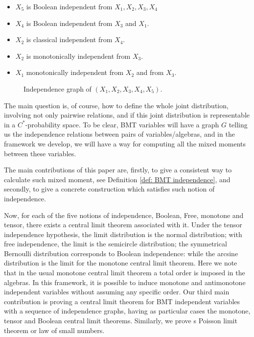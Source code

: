 \documentclass[a4paper,12pt]{extarticle}
\theoremstyle{definition}
\theoremstyle{remark}
\begin{document}
\begin{itemize}
    \item  $X_5$ is Boolean independent from $X_1,X_2,X_3,X_4$
\item $X_4$ is Boolean independent from $X_3$ and $X_1$.
\item $X_2$ is classical independent from $X_4$.
\item  $X_2$ is monotonically independent from $X_3$.
\item $X_1$ monotonically independent from $X_2$ and from $X_3$.
\end{itemize}

\begin{figure} %
\centering 
  \caption{Independence graph of $(X_1,X_2,X_3,X_4,X_5)$.}
  \label{graph1}
\end{figure}

The main question is, of course, how to define the whole joint distribution, involving not only pairwise relations, and if this joint distribution is representable in a $C^{\ast}$-probability space.  To be clear, BMT variables will have a graph $G$ telling us the independence relations between pairs of variables/algebras, and in the framework we develop, we will have a way for computing  all the mixed moments between these variables.

The main contributions of this paper are, firstly, to give a consistent way to calculate such mixed moment, see Definition \ref{def: BMT independence}, and secondly, to give a concrete construction which satisfies such notion of independence. 


Now, for each of the five notions of independence, Boolean, Free, monotone and tensor, there exists a central limit theorem associated with it. Under the tensor independence hypothesis, the limit distribution is the normal distribution; with free independence, the limit is the semicircle distribution; the symmetrical Bernoulli distribution corresponds to Boolean independence: while the arcsine distribution is the limit for the monotone central limit theorem. Here we note that in the usual monotone central limit theorem a total order is imposed in the algebras. In this framework, it is possible to induce monotone and antimonotone independent variables without assuming any specific order. Our third main contribution is proving a central limit theorem for BMT independent variables with a sequence of independence graphs, having as particular cases the monotone, tensor and Boolean central limit theorems.  Similarly, we prove s Poisson limit theorem or law of small numbers.
\end{document}
